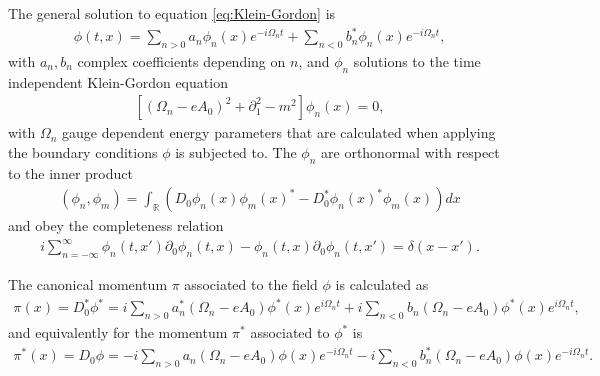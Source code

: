The general solution to equation \eqref{eq:Klein-Gordon} is 
\begin{align}
	\phi(t, x) = \sum_{n>0}^{} a_n \phi_n (x) e^{-i\Omega_n t}
+\sum_{n<0}^{} b^*_n \phi_n (x) e^{-i\Omega_n t},
\end{align}
with $a_n, b_n$ complex coefficients depending on $n $, and $\phi_n$ solutions to the time independent Klein-Gordon equation
\begin{align}
	\left[ \left( \Omega_n - eA_0 \right)^2 + \partial_1^2 - m^2  \right] \phi_n(x) = 0,
\end{align}
with $\Omega_n$ gauge dependent energy parameters that are calculated when applying the boundary conditions $\phi$ is subjected to. The $\phi_n$ are orthonormal with respect to the inner product 
\begin{align}
	(\phi_n, \phi_m) = \int_{\mathbb{R}}^{} \left( D_0\phi_n(x) \phi_m(x)^* - D_0^*\phi_n(x)^* \phi_m(x) \right) dx
\end{align}
and obey the completeness relation
\begin{align}
	i \sum_{n=-\infty}^{\infty} \phi_n(t, x') \partial_0 \phi_n(t, x) - \phi_n(t, x) \partial_0 \phi_n(t, x') = \delta ( x - x').
\end{align}

The canonical momentum $\pi$ associated to the field $\phi$ is calculated as
\begin{align}
	\pi(x) = D_0^*\phi^*= i\sum_{n>0}^{} a^*_n(\Omega_n - eA_0)\phi^*(x) e^{i\Omega_n t}
+ i\sum_{n<0}^{} b_n(\Omega_n - eA_0)\phi^*(x) e^{i\Omega_n t},
\end{align}
and equivalently for the momentum $\pi^*$ associated to $\phi^*$ is  
\begin{align}
	\pi^*(x) = D_0\phi= -i\sum_{n>0}^{} a_n(\Omega_n - eA_0)\phi(x) e^{-i\Omega_n t}
- i\sum_{n<0}^{} b_n^*(\Omega_n - eA_0)\phi(x) e^{-i\Omega_n t}.
\end{align}

